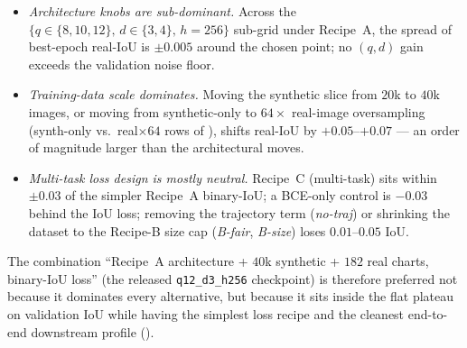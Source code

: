 \documentclass{article}
\begin{document}
\begin{itemize}
\item \emph{Architecture knobs are sub-dominant.} Across the
$\{q{\in}\{8,10,12\},\,d{\in}\{3,4\},\,h{=}256\}$ sub-grid under
Recipe~A, the spread of best-epoch real-IoU is $\pm 0.005$ around
the chosen point; no $(q,d)$ gain exceeds the validation noise
floor.
\item \emph{Training-data scale dominates.} Moving the synthetic
slice from $20$k to $40$k images, or moving from synthetic-only to
$64{\times}$ real-image oversampling (synth-only vs.\
real$\times 64$ rows of ), shifts real-IoU by
$+0.05$--$+0.07$ --- an order of magnitude larger than the
architectural moves.
\item \emph{Multi-task loss design is mostly neutral.} Recipe~C
(multi-task) sits within $\pm 0.03$ of the simpler Recipe~A
binary-IoU; a BCE-only control is $-0.03$ behind the IoU loss;
removing the trajectory term (\emph{no-traj}) or shrinking the
dataset to the Recipe-B size cap (\emph{B-fair}, \emph{B-size})
loses $0.01$--$0.05$ IoU.
\end{itemize}

The combination ``Recipe~A architecture + $40$k synthetic + $182$
real charts, binary-IoU loss'' (the released
\texttt{q12\_d3\_h256} checkpoint) is therefore preferred not
because it dominates every alternative, but because it sits inside
the flat plateau on validation IoU while having the simplest loss
recipe and the cleanest end-to-end downstream profile
().
\end{document}
